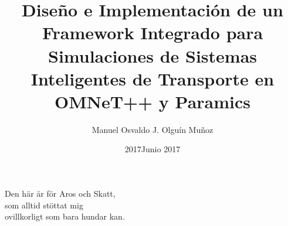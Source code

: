 \documentclass[upright, contnum]{umemoria}
\author{Manuel Osvaldo J. Olguín Muñoz}
\title{Diseño e Implementación de un Framework Integrado para Simulaciones de Sistemas Inteligentes de Transporte en OMNeT++ y Paramics}
\date{2017}
\begin{document}
\frontmatter
\maketitle

\date{Junio 2017}
\begin{abstract}

\end{abstract}

\begin{dedicatoria}
Den här är för Aros och Skatt,\\ som alltid stöttat mig\\ ovillkorligt som bara hundar kan.
\end{dedicatoria}



\tableofcontents
\listoftables
\listoffigures

\mainmatter





%



\blankpage

\printbibliography[heading=bibintoc]
    
\blankpage
\appendix

\end{document}
